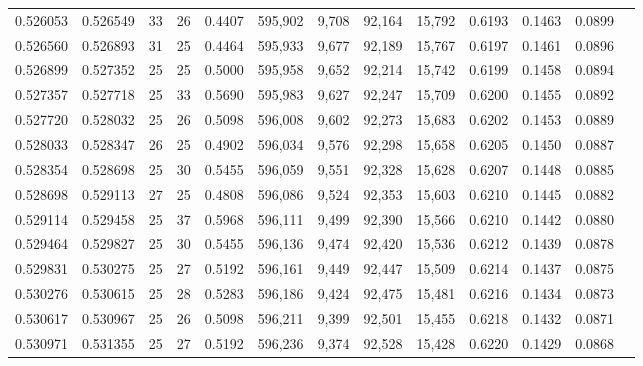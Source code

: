 \begin{tabular}{rrrrrrrrrrrrr}
0.526053 & 0.526549 &    33 &  26 &                                     0.4407 & 595,902 &   9,708 &  92,164 &  15,792 & 0.6193 & 0.1463 & 0.0899 \\
0.526560 & 0.526893 &    31 &  25 &                                     0.4464 & 595,933 &   9,677 &  92,189 &  15,767 & 0.6197 & 0.1461 & 0.0896 \\
0.526899 & 0.527352 &    25 &  25 &                                     0.5000 & 595,958 &   9,652 &  92,214 &  15,742 & 0.6199 & 0.1458 & 0.0894 \\
0.527357 & 0.527718 &    25 &  33 &                                     0.5690 & 595,983 &   9,627 &  92,247 &  15,709 & 0.6200 & 0.1455 & 0.0892 \\
0.527720 & 0.528032 &    25 &  26 &                                     0.5098 & 596,008 &   9,602 &  92,273 &  15,683 & 0.6202 & 0.1453 & 0.0889 \\
0.528033 & 0.528347 &    26 &  25 &                                     0.4902 & 596,034 &   9,576 &  92,298 &  15,658 & 0.6205 & 0.1450 & 0.0887 \\
0.528354 & 0.528698 &    25 &  30 &                                     0.5455 & 596,059 &   9,551 &  92,328 &  15,628 & 0.6207 & 0.1448 & 0.0885 \\
0.528698 & 0.529113 &    27 &  25 &                                     0.4808 & 596,086 &   9,524 &  92,353 &  15,603 & 0.6210 & 0.1445 & 0.0882 \\
0.529114 & 0.529458 &    25 &  37 &                                     0.5968 & 596,111 &   9,499 &  92,390 &  15,566 & 0.6210 & 0.1442 & 0.0880 \\
0.529464 & 0.529827 &    25 &  30 &                                     0.5455 & 596,136 &   9,474 &  92,420 &  15,536 & 0.6212 & 0.1439 & 0.0878 \\
0.529831 & 0.530275 &    25 &  27 &                                     0.5192 & 596,161 &   9,449 &  92,447 &  15,509 & 0.6214 & 0.1437 & 0.0875 \\
0.530276 & 0.530615 &    25 &  28 &                                     0.5283 & 596,186 &   9,424 &  92,475 &  15,481 & 0.6216 & 0.1434 & 0.0873 \\
0.530617 & 0.530967 &    25 &  26 &                                     0.5098 & 596,211 &   9,399 &  92,501 &  15,455 & 0.6218 & 0.1432 & 0.0871 \\
0.530971 & 0.531355 &    25 &  27 &                                     0.5192 & 596,236 &   9,374 &  92,528 &  15,428 & 0.6220 & 0.1429 & 0.0868 \\

\end{tabular}
